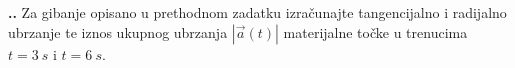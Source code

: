 

\noindent 
\textbf{
\thecjelina.\thezadatak.}
Za gibanje opisano u prethodnom zadatku izračunajte tangencijalno i radijalno ubrzanje 
te iznos ukupnog ubrzanja $|\vec{a}(t)|$ materijalne točke u trenucima $t=3\ s$ i $t=6\ s$.

